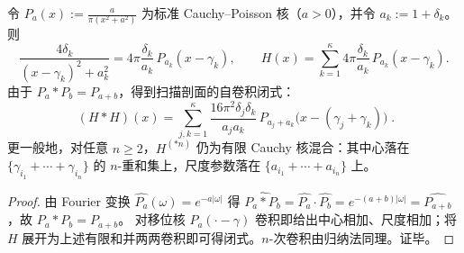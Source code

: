 \begin{proposition}\label{prop:xi-basepoint-scan-cauchy-stable-convolution}
令 \(P_a(x):=\frac{a}{\pi(x^2+a^2)}\) 为标准 Cauchy--Poisson 核（\(a>0\)），并令 \(a_k:=1+\delta_k\)。
则
\[
\frac{4\delta_k}{(x-\gamma_k)^2+a_k^2}
=4\pi\frac{\delta_k}{a_k}\,P_{a_k}(x-\gamma_k),
\qquad
H(x)=\sum_{k=1}^{\kappa}4\pi\frac{\delta_k}{a_k}\,P_{a_k}(x-\gamma_k).
\]
由于 \(P_a*P_b=P_{a+b}\)，得到扫描剖面的自卷积闭式：
\[
\boxed{\;
(H*H)(x)=
\sum_{j,k=1}^{\kappa}\frac{16\pi^{2}\delta_j\delta_k}{a_ja_k}\,
P_{a_j+a_k}\bigl(x-(\gamma_j+\gamma_k)\bigr)\; }.
\]
更一般地，对任意 \(n\ge 2\)，\(H^{(*n)}\) 仍为有限 Cauchy 核混合：其中心落在 \(\{\gamma_{i_1}+\cdots+\gamma_{i_n}\}\) 的 \(n\)-重和集上，尺度参数落在 \(\{a_{i_1}+\cdots+a_{i_n}\}\) 上。
\end{proposition}
\begin{proof}
由 Fourier 变换 \(\widehat{P_a}(\omega)=e^{-a|\omega|}\) 得
\(
\widehat{P_a*P_b}=\widehat{P_a}\cdot\widehat{P_b}=e^{-(a+b)|\omega|}=\widehat{P_{a+b}}
\)，故 \(P_a*P_b=P_{a+b}\)。
对移位核 \(P_a(\cdot-\gamma)\) 卷积即给出中心相加、尺度相加；将 \(H\) 展开为上述有限和并两两卷积即可得闭式。\(n\)-次卷积由归纳法同理。证毕。
\end{proof}



\endinput
